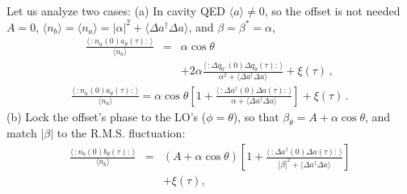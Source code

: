 \documentclass[twocolumn,aps,eqsecnum,showkeys,amsmath]{revtex4}
\begin{document}
Let us analyze two cases: (a) In cavity QED 
$\langle a \rangle \neq 0$, so the offset is not needed $A=0$, 
$\langle n_b \rangle = \langle n_a \rangle = 
|\alpha|^2 +\langle \Delta a^\dag \Delta a \rangle$, and 
$\beta=\beta^\ast=\alpha$, 
%
\begin{eqnarray}
\frac{\langle\,:\! n_a(0) a_\theta(\tau)\!:\,\rangle}
	{\langle n_a\rangle} &=& \alpha \cos{\theta}  \\
	&&+2\alpha \frac{\langle\,:\! \Delta q_{0^\circ}(0) 
	\Delta q_\theta(\tau)\!:\,\rangle}
	{\alpha^2 +\langle \Delta a^\dag \Delta a \rangle} 
	+\xi(\tau) \,,	\nonumber 
\end{eqnarray}
%
\begin{eqnarray}
\frac{\langle\,:\! n_a(0) a_\theta(\tau)\!:\,\rangle}
	{\langle n_a\rangle} = \alpha \cos{\theta}  \left[ 1+  
\frac{\langle\,:\! \Delta a^\dag (0) \Delta a (\tau)\!:\,\rangle}
	{\alpha +\langle \Delta a^\dag \Delta a \rangle} \right]
 	+\xi(\tau) \,.			\nonumber
\end{eqnarray}
(b) Lock the offset's phase to the LO's ($\phi=\theta$), so that 
$\beta_\theta = A+ \alpha \cos{\theta}$, and match $|\beta|$ 
to the R.M.S. fluctuation:
%
\begin{eqnarray}
\frac{\langle\,:\! n_b(0) b_\theta(\tau)\!:\,\rangle}
	{\langle n_b\rangle} &=& (A+ \alpha\cos{\theta}) \left[ 1+  
\frac{\langle\,:\! \Delta a^\dag (0) \Delta a (\tau)\!:\,\rangle}
	{|\beta|^2 +\langle \Delta a^\dag \Delta a \rangle} \right] 
	\nonumber \\
	&&+\xi(\tau),	 
\end{eqnarray}
\end{document}
